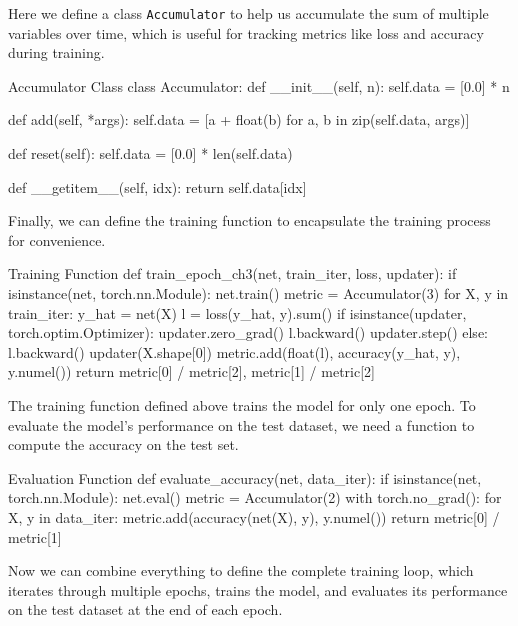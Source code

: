 Here we define a class \texttt{Accumulator} to help us accumulate the sum of multiple variables over time, which is useful for tracking metrics like loss and accuracy during training.

\begin{pythoncode}{Accumulator Class}
class Accumulator:
    def __init__(self, n):
        self.data = [0.0] * n

    def add(self, *args):
        self.data = [a + float(b) for a, b in zip(self.data, args)]

    def reset(self):
        self.data = [0.0] * len(self.data)

    def __getitem__(self, idx):
        return self.data[idx]
\end{pythoncode}

Finally, we can define the training function to encapsulate the training process for convenience.

\begin{pythoncode}{Training Function}
def train_epoch_ch3(net, train_iter, loss, updater):
    if isinstance(net, torch.nn.Module):
        net.train()
    metric = Accumulator(3)
    for X, y in train_iter:
        y_hat = net(X)
        l = loss(y_hat, y).sum()
        if isinstance(updater, torch.optim.Optimizer):
            updater.zero_grad()
            l.backward()
            updater.step()
        else:
            l.backward()
            updater(X.shape[0])
        metric.add(float(l), accuracy(y_hat, y), y.numel())
    return metric[0] / metric[2], metric[1] / metric[2]
\end{pythoncode}

The training function defined above trains the model for only one epoch. To evaluate the model's performance on the test dataset, we need a function to compute the accuracy on the test set.

\begin{pythoncode}{Evaluation Function}
def evaluate_accuracy(net, data_iter):
    if isinstance(net, torch.nn.Module):
        net.eval()
    metric = Accumulator(2)
    with torch.no_grad():
        for X, y in data_iter:
            metric.add(accuracy(net(X), y), y.numel())
    return metric[0] / metric[1]
\end{pythoncode}

Now we can combine everything to define the complete training loop, which iterates through multiple epochs, trains the model, and evaluates its performance on the test dataset at the end of each epoch.

